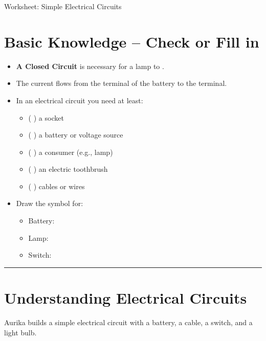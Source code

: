 \documentclass[a4paper,12pt]{article}
\begin{document}
	
	Worksheet: Simple Electrical Circuits
	
	\section*{Basic Knowledge – Check or Fill in}
	
	\begin{itemize}
		\item \textbf{A Closed Circuit} is necessary for a lamp to \underline{\hspace{3cm}}.
		
		\item The current flows from the \underline{\hspace{2.5cm}} terminal of the battery to the \underline{\hspace{2.5cm}} terminal.
		
		\item In an electrical circuit you need at least:
		\begin{itemize}
			\item ( ) a socket
			\item ( ) a battery or voltage source
			\item ( ) a consumer (e.g., lamp)
			\item ( ) an electric toothbrush
			\item ( ) cables or wires
		\end{itemize}
		
		\item Draw the symbol for:
		\begin{itemize}
			\item Battery: \underline{\hspace{5cm}}
			\item Lamp: \underline{\hspace{5cm}}
			\item Switch: \underline{\hspace{5cm}}
		\end{itemize}
	\end{itemize}
	
	\vspace{1em}
	\hrule
	\vspace{1em}
	
	\section*{Understanding Electrical Circuits }
	
	Aurika builds a simple electrical circuit with a battery, a cable, a switch, and a light bulb.
	
\end{document}
